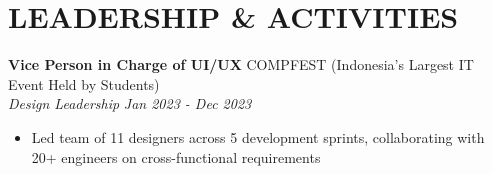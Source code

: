 \documentclass[10pt,a4paper]{article}
\newcommand{\experienceheader}[4]{
    \textbf{#1} \hfill #2 \\
    \textit{#3} \hfill \textit{#4}
}
\begin{document}
\section*{LEADERSHIP \& ACTIVITIES}

\experienceheader{Vice Person in Charge of UI/UX}{COMPFEST (Indonesia's Largest IT Event Held by Students)}{Design Leadership}{Jan 2023 - Dec 2023}
\begin{itemize}[leftmargin=*, itemsep=1pt, topsep=1pt]
    \item Led team of 11 designers across 5 development sprints, collaborating with 20+ engineers on cross-functional requirements
\end{itemize}
\end{document}
